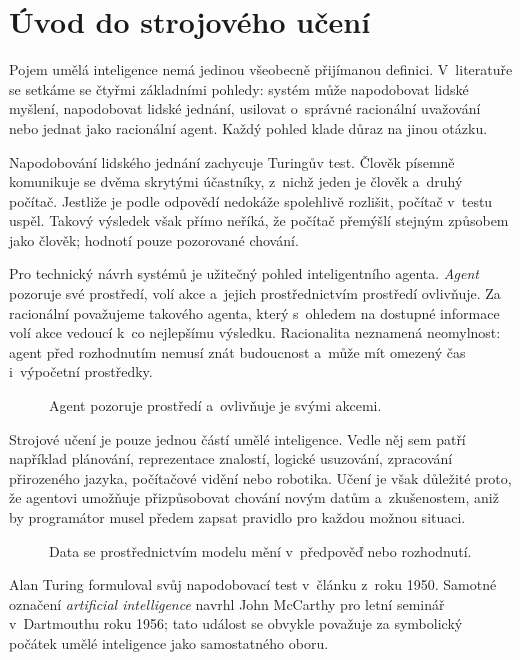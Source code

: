 \section{Úvod do strojového učení}\label{sec:ai-uvod-ai}

Pojem umělá inteligence nemá jedinou všeobecně přijímanou definici. V~literatuře se setkáme se čtyřmi základními pohledy: systém může napodobovat lidské myšlení, napodobovat lidské jednání, usilovat o~správné racionální uvažování nebo jednat jako racionální agent. Každý pohled klade důraz na jinou otázku.

Napodobování lidského jednání zachycuje Turingův test. Člověk písemně komunikuje se dvěma skrytými účastníky, z~nichž jeden je člověk a~druhý počítač. Jestliže je podle odpovědí nedokáže spolehlivě rozlišit, počítač v~testu uspěl. Takový výsledek však přímo neříká, že počítač přemýšlí stejným způsobem jako člověk; hodnotí pouze pozorované chování.

Pro technický návrh systémů je užitečný pohled inteligentního agenta. \emph{Agent} pozoruje své prostředí, volí akce a~jejich prostřednictvím prostředí ovlivňuje. Za racionální považujeme takového agenta, který s~ohledem na dostupné informace volí akce vedoucí k~co nejlepšímu výsledku. Racionalita neznamená neomylnost: agent před rozhodnutím nemusí znát budoucnost a~může mít omezený čas i~výpočetní prostředky.

\begin{figure}[ht]
    \centering
    
    \caption{Agent pozoruje prostředí a~ovlivňuje je svými akcemi.}
    \label{fig:ai-agent-prostredi}
\end{figure}

Strojové učení je pouze jednou částí umělé inteligence. Vedle něj sem patří například plánování, reprezentace znalostí, logické usuzování, zpracování přirozeného jazyka, počítačové vidění nebo robotika. Učení je však důležité proto, že agentovi umožňuje přizpůsobovat chování novým datům a~zkušenostem, aniž by programátor musel předem zapsat pravidlo pro každou možnou situaci.

\begin{figure}[ht]
    \centering
    
    \caption{Data se prostřednictvím modelu mění v~předpověď nebo rozhodnutí.}
    \label{fig:ai-data-model-rozhodnuti}
\end{figure}


\begin{remark}
    Alan Turing formuloval svůj napodobovací test v~článku z~roku 1950. Samotné označení \emph{artificial intelligence} navrhl John McCarthy pro letní seminář v~Dartmouthu roku 1956; tato událost se obvykle považuje za symbolický počátek umělé inteligence jako samostatného oboru.
\end{remark}
